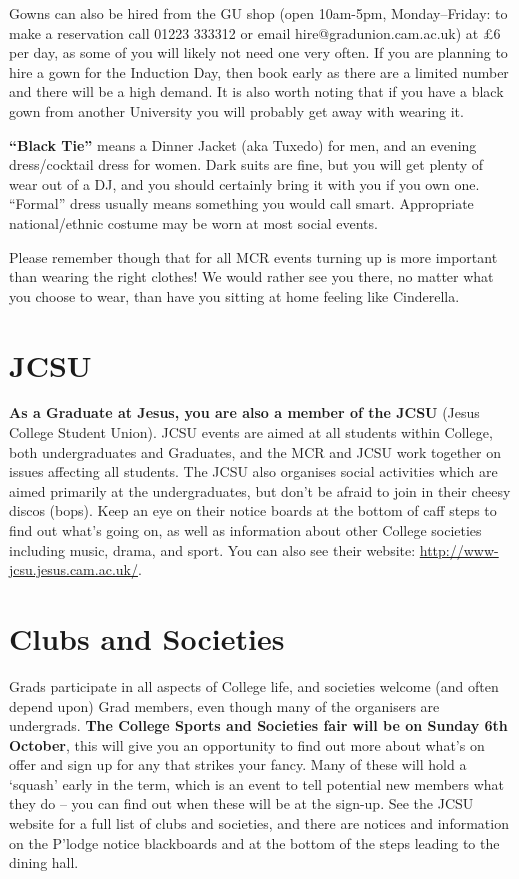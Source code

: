 \documentclass[11pt,fleqn, oneside]{book} %
\begin{document}
Gowns can also be hired from the GU shop (open 10am-5pm, Monday–Friday: to make a reservation call 01223 333312 or email hire@gradunion.cam.ac.uk) at £6 per day, as some of you will likely not need one very often. If you are planning to hire a gown for the Induction Day, then book early as there are a limited number and there will be a high demand.  It is also worth noting that if you have a black gown from another University you will probably get away with wearing it.

\textbf{“Black Tie”} means a Dinner Jacket (aka Tuxedo) for men, and an evening dress/cocktail dress for women. Dark suits are fine, but you will get plenty of wear out of a DJ, and you should certainly bring it with you if you own one. “Formal” dress usually means something you would call smart. Appropriate national/ethnic costume may be worn at most social events. 

Please remember though that for all MCR events turning up is more important than wearing the right clothes! We would rather see you there, no matter what you choose to wear, than have you sitting at home feeling like Cinderella. 

\section{JCSU}

\textbf{As a Graduate at Jesus, you are also a member of the JCSU} (Jesus College Student Union).  JCSU events are aimed at all students within College, both undergraduates and Graduates, and the MCR and JCSU work together on issues affecting all students. The JCSU also organises social activities which are aimed primarily at the undergraduates, but don’t be afraid to join in their cheesy discos (bops). Keep an eye on their notice boards at the bottom of caff steps to find out what’s going on, as well as information about other College societies including music, drama, and sport.  You can also see their website: \url{http://www-jcsu.jesus.cam.ac.uk/}. 

\section{Clubs and Societies}

Grads participate in all aspects of College life, and societies welcome (and often depend upon) Grad members, even though many of the organisers are undergrads. \textbf{The College Sports and Societies fair will be on Sunday 6th October}, this will give you an opportunity to find out more about what’s on offer and sign up for any that strikes your fancy.  Many of these will hold a ‘squash’ early in the term, which is an event to tell potential new members what they do – you can find out when these will be at the sign-up. See the JCSU website for a full list of clubs and societies, and there are notices and information on the P’lodge notice blackboards and at the bottom of the steps leading to the dining hall. 
\end{document}

